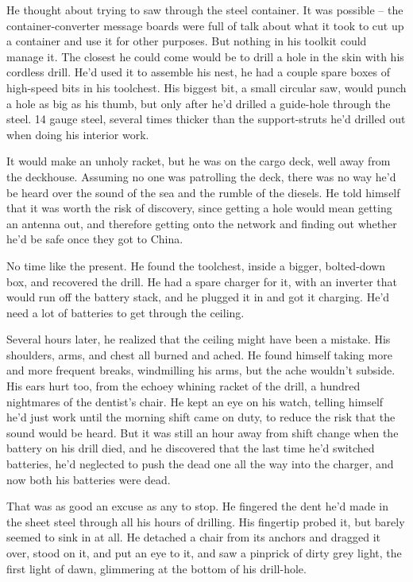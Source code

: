 He thought about trying to saw through the steel container. It was
possible -- the container-converter message boards were full of
talk about what it took to cut up a container and use it for other
purposes. But nothing in his toolkit could manage it. The closest
he could come would be to drill a hole in the skin with his
cordless drill. He'd used it to assemble his nest, he had a couple
spare boxes of high-speed bits in his toolchest. His biggest bit, a
small circular saw, would punch a hole as big as his thumb, but
only after he'd drilled a guide-hole through the steel. 14 gauge
steel, several times thicker than the support-struts he'd drilled
out when doing his interior work.

It would make an unholy racket, but he was on the cargo deck, well
away from the deckhouse. Assuming no one was patrolling the deck,
there was no way he'd be heard over the sound of the sea and the
rumble of the diesels. He told himself that it was worth the risk
of discovery, since getting a hole would mean getting an antenna
out, and therefore getting onto the network and finding out whether
he'd be safe once they got to China.

No time like the present. He found the toolchest, inside a bigger,
bolted-down box, and recovered the drill. He had a spare charger
for it, with an inverter that would run off the battery stack, and
he plugged it in and got it charging. He'd need a lot of batteries
to get through the ceiling.

Several hours later, he realized that the ceiling might have been a
mistake. His shoulders, arms, and chest all burned and ached. He
found himself taking more and more frequent breaks, windmilling his
arms, but the ache wouldn't subside. His ears hurt too, from the
echoey whining racket of the drill, a hundred nightmares of the
dentist's chair. He kept an eye on his watch, telling himself he'd
just work until the morning shift came on duty, to reduce the risk
that the sound would be heard. But it was still an hour away from
shift change when the battery on his drill died, and he discovered
that the last time he'd switched batteries, he'd neglected to push
the dead one all the way into the charger, and now both his
batteries were dead.

That was as good an excuse as any to stop. He fingered the dent
he'd made in the sheet steel through all his hours of drilling. His
fingertip probed it, but barely seemed to sink in at all. He
detached a chair from its anchors and dragged it over, stood on it,
and put an eye to it, and saw a pinprick of dirty grey light, the
first light of dawn, glimmering at the bottom of his drill-hole.

